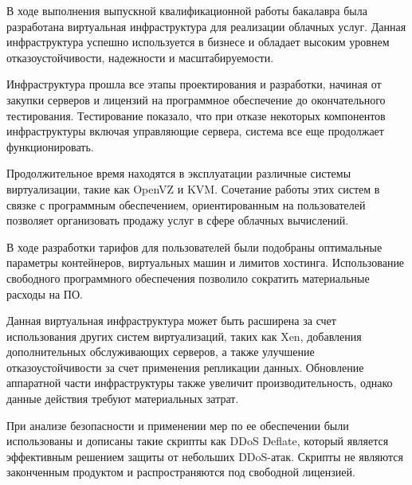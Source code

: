 
В ходе выполнения выпускной квалификационной работы бакалавра была разработана виртуальная инфраструктура для реализации облачных услуг.
Данная инфраструктура успешно используется в бизнесе и обладает высоким уровнем отказоустойчивости, надежности и масштабируемости.

Инфраструктура прошла все этапы проектирования и разработки, начиная от закупки серверов и лицензий на программное обеспечение до окончательного тестирования.
Тестирование показало, что при отказе некоторых компонентов инфраструктуры включая управляющие сервера, система все еще продолжает функционировать.

Продолжительное время находятся в эксплуатации различные системы виртуализации, такие как OpenVZ и KVM.
Сочетание работы этих систем в связке с программным обеспечением, ориентированным на пользователей позволяет организовать продажу услуг в сфере облачных вычислений.

В ходе разработки тарифов для пользователей были подобраны оптимальные параметры контейнеров, виртуальных машин и лимитов хостинга.
Использование свободного программного обеспечения позволило сократить материальные расходы на ПО.

Данная виртуальная инфраструктура может быть расширена за счет использования других систем виртуализаций, таких как Xen, добавления дополнительных обслуживающих серверов, а также улучшение отказоустойчивости за счет применения репликации данных.
Обновление аппаратной части инфраструктуры также увеличит производительность, однако данные действия требуют материальных затрат.

При анализе безопасности и применении мер по ее обеспечении были использованы и дописаны такие скрипты как DDoS Deflate, который является эффективным решением защиты от небольших DDoS-атак.
Скрипты не являются законченным продуктом и распространяются под свободной лицензией.

\clearpage

